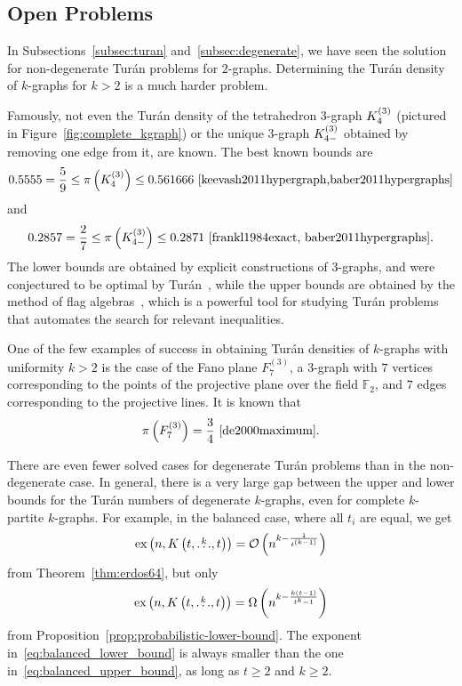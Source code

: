 \subsection{Open Problems}\label{subsec:open-problems} %

In Subsections~\ref{subsec:turan} and~\ref{subsec:degenerate}, we have
seen the solution for non-degenerate Turán problems for $2$-graphs.
Determining the Turán density of $k$-graphs for $k > 2$ is a much harder problem.

Famously, not even the Turán density of the tetrahedron $3$-graph $K^{(3)}_{4}$
(pictured in Figure~\ref{fig:complete_kgraph}) or the unique $3$-graph $K^{(3)}_{4-}$
obtained by removing one edge from it, are known.
The best known bounds are
\[
    0.5555 = \frac{5}{9}
    \leq \pi\left(\completesuperindex{3}{4}\right)
    \leq 0.561666~\cite{keevash2011hypergraph,baber2011hypergraphs} %
\]
and
\[
     0.2857 = \frac{2}{7}
     \leq \pi\left(K^{(3)}_{4-}\right)
     \leq 0.2871~\cite{frankl1984exact, baber2011hypergraphs}.
\]
The lower bounds are obtained by explicit constructions of $3$-graphs,
and were conjectured to be optimal by Turán~\cite{keevash2011hypergraph},
while the upper bounds are obtained by the method of flag algebras~\cite{razborov2007flag},
which is a powerful tool for studying Turán problems that automates the search for relevant inequalities.

One of the few examples of success in obtaining Turán densities of $k$-graphs with uniformity $k > 2$ is the case of
the Fano plane $F^{(3)}_7$, a $3$-graph with $7$ vertices corresponding to the points
of the projective plane over the field $\mathbb{F}_2$,
and $7$ edges corresponding to the projective lines.
It is known that
\[
    \pi\left(F^{(3)}_7\right) = \frac{3}{4}~\cite{de2000maximum}.
\]

There are even fewer solved cases for degenerate Turán problems than in the non-degenerate case.
In general, there is a very large gap between the upper and lower bounds for the Turán numbers of degenerate $k$-graphs,
even for complete $k$-partite $k$-graphs.
For example, in the balanced case, where all $t_i$ are equal, we get
\begin{equation} \label{eq:balanced_upper_bound}
    \text{ex} \left( n, K\left(t, \overset{k}{\dots}, t\right) \right) = \mathcal{O}\left(n^{k - \frac{1}{t^{(k-1)}}}\right)
\end{equation}
from Theorem~\ref{thm:erdos64}, but only
\begin{equation} \label{eq:balanced_lower_bound}
    \text{ex} \left( n, K\left(t, \overset{k}{\dots}, t\right) \right) = \Omega\left(n^{k - \frac{k(t-1)}{t^k - 1}}\right)
\end{equation}
from Proposition~\ref{prop:probabilistic-lower-bound}.
The exponent in~\eqref{eq:balanced_lower_bound} is always
smaller than the one in~\eqref{eq:balanced_upper_bound},
as long as $t \geq 2$ and $k \geq 2$.

